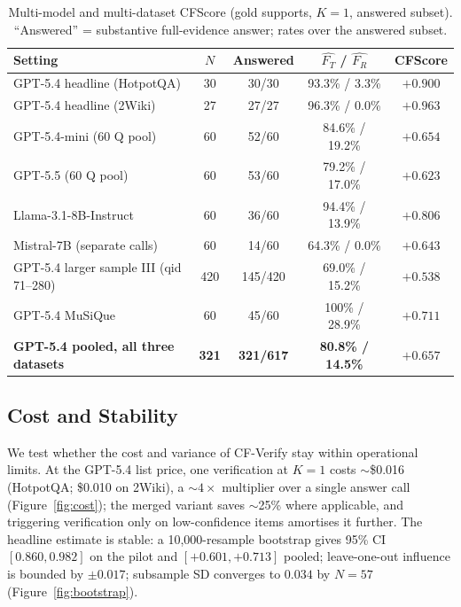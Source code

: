 \documentclass[11pt]{article}
\begin{document}
\begin{table}[t]
\centering
\small
\caption{Multi-model and multi-dataset CFScore (gold supports, $K{=}1$, answered subset). ``Answered'' = substantive full-evidence answer; rates over the answered subset.}
\label{tab:multimodel}
\begin{tabular}{@{}lcccc@{}}
\toprule
Setting & $N$ & Answered & $\widehat{F_T}$ / $\widehat{F_R}$ & CFScore \\
\midrule
GPT-5.4 headline (HotpotQA)  & 30 & 30/30 & 93.3\% / 3.3\%  & $+0.900$ \\
GPT-5.4 headline (2Wiki)     & 27 & 27/27 & 96.3\% / 0.0\%  & $+0.963$ \\
GPT-5.4-mini (60 Q pool)     & 60 & 52/60 & 84.6\% / 19.2\% & $+0.654$ \\
GPT-5.5 (60 Q pool)          & 60 & 53/60 & 79.2\% / 17.0\% & $+0.623$ \\
Llama-3.1-8B-Instruct        & 60 & 36/60 & 94.4\% / 13.9\% & $+0.806$ \\
Mistral-7B (separate calls)  & 60 & 14/60 & 64.3\% / 0.0\%  & $+0.643$ \\
\midrule
GPT-5.4 larger sample III (qid 71--280) & 420 & 145/420 & 69.0\% / 15.2\% & $+0.538$ \\
GPT-5.4 MuSiQue              & 60 & 45/60 & 100\% / 28.9\%  & $+0.711$ \\
\midrule
\textbf{GPT-5.4 pooled, all three datasets} & \textbf{321} & \textbf{321/617} & \textbf{80.8\% / 14.5\%} & $\mathbf{+0.657}$ \\
\bottomrule
\end{tabular}
\end{table}

\subsection{Cost and Stability}
\label{sec:cost}
We test whether the cost and variance of CF-Verify stay within operational limits. At the GPT-5.4 list price, one verification at $K{=}1$ costs $\sim$\$0.016 (HotpotQA; \$0.010 on 2Wiki), a $\sim$$4\times$ multiplier over a single answer call (Figure~\ref{fig:cost}); the merged variant saves $\sim$25\% where applicable, and triggering verification only on low-confidence items amortises it further. The headline estimate is stable: a 10{,}000-resample bootstrap gives 95\% CI $[0.860, 0.982]$ on the pilot and $[+0.601,+0.713]$ pooled; leave-one-out influence is bounded by $\pm 0.017$; subsample SD converges to $0.034$ by $N{=}57$ (Figure~\ref{fig:bootstrap}).
\end{document}
